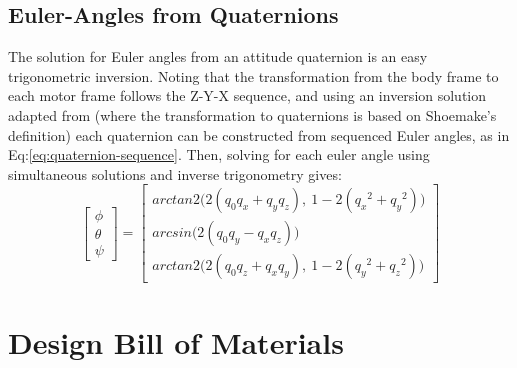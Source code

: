 \section{Euler-Angles from Quaternions}
\label{app:equations.quaternions}
The solution for Euler angles from an attitude quaternion is an easy trigonometric inversion. Noting that the transformation from the body frame to each motor frame follows the Z-Y-X sequence, and using an inversion solution adapted from \cite{computingeuler} (where the transformation to quaternions is based on Shoemake's\cite{shoemake} definition) each quaternion can be constructed from sequenced Euler angles, as in Eq:\ref{eq:quaternion-sequence}.
Then, solving for each euler angle using simultaneous solutions and inverse trigonometry gives:
\begin{equation}\label{eq:app-quaternion-eule}
\begin{bmatrix}
\phi\\
\theta\\
\psi
\end{bmatrix}
=
\begin{bmatrix}
arctan2\big(2(q_0q_x+q_yq_z),~1-2(q_x\text{}^2+q_y\text{}^2)\big)\\
arcsin\big(2(q_0q_y-q_xq_z)\big)\\
arctan2\big(2(q_0q_z+q_xq_y),~1-2(q_y\text{}^2+q_z\text{}^2)\big)
\end{bmatrix}
\end{equation}
\chapter{Design Bill of Materials}
\label{app:bom}
